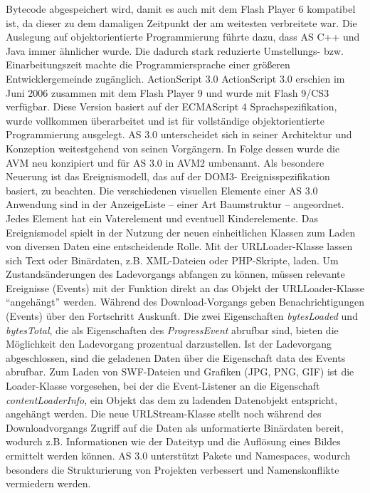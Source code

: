 Bytecode abgespeichert wird, damit es auch mit dem Flash Player 6 kompatibel
ist, da dieser zu dem damaligen Zeitpunkt der am weitesten verbreitete war.
Die Auslegung auf objektorientierte Programmierung führte dazu, dass AS C++
und Java immer ähnlicher wurde. Die dadurch stark reduzierte Umstellungs-
bzw. Einarbeitungszeit machte die Programmiersprache einer größeren
Entwicklergemeinde zugänglich.
ActionScript 3.0
ActionScript 3.0 erschien im Juni 2006 zusammen mit dem Flash Player 9 und
wurde mit Flash 9/CS3 verfügbar. Diese Version basiert auf der ECMAScript 4
Sprachspezifikation, wurde vollkommen überarbeitet und ist für vollständige
objektorientierte Programmierung ausgelegt. AS 3.0 unterscheidet sich in
seiner Architektur und Konzeption weitestgehend von seinen Vorgängern. In
Folge dessen wurde die AVM neu konzipiert und für AS 3.0 in AVM2 umbenannt.
Als besondere Neuerung ist das Ereignismodell, das auf der DOM3-
Ereignisspezifikation basiert, zu beachten. Die verschiedenen visuellen
Elemente einer AS 3.0 Anwendung sind in der AnzeigeListe -- einer Art
Baumstruktur -- angeordnet. Jedes Element hat ein Vaterelement und eventuell
Kinderelemente. Das Ereignismodel spielt in der Nutzung der neuen einheitlichen
Klassen zum Laden von diversen Daten eine entscheidende Rolle.
Mit der URLLoader-Klasse lassen sich Text oder Binärdaten, z.B. XML-Dateien
oder PHP-Skripte, laden. Um Zustandsänderungen des Ladevorgangs abfangen zu
können, müssen relevante Ereignisse (Events) mit der Funktion
 direkt an das Objekt der URLLoader-Klasse
"`angehängt"' werden. Während des Download-Vorgangs geben Benachrichtigungen
(Events) über den Fortschritt Auskunft. Die zwei Eigenschaften
\emph{bytesLoaded} und \emph{bytesTotal}, die als Eigenschaften des
\emph{ProgressEvent} abrufbar sind, bieten die Möglichkeit den Ladevorgang
prozentual darzustellen. Ist der Ladevorgang abgeschlossen, sind die geladenen
Daten über die Eigenschaft data des Events abrufbar.
Zum Laden von SWF-Dateien und Grafiken (JPG, PNG, GIF) ist die Loader-Klasse
vorgesehen, bei der die Event-Listener an die Eigenschaft
\emph{contentLoaderInfo}, ein Objekt das dem zu ladenden Datenobjekt
entspricht, angehängt werden.
Die neue URLStream-Klasse stellt noch während des Downloadvorgangs Zugriff auf
die Daten als unformatierte Binärdaten bereit, wodurch z.B. Informationen wie
der Dateityp und die Auflösung eines Bildes ermittelt werden können.
AS 3.0 unterstützt Pakete und Namespaces, wodurch besonders die Strukturierung
von Projekten verbessert und Namenskonflikte vermiedern werden.
